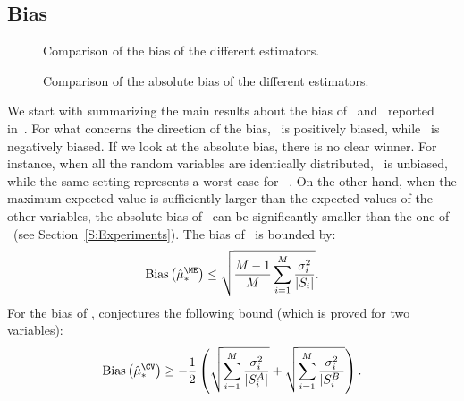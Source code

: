\subsection{Bias}

\begin{figure}[t]
    \begin{minipage}{0.45\textwidth}
    \centering 
    \setlength\figureheight{4cm}
    \setlength\figurewidth{6cm}
     
    \caption{Comparison of the bias of the different estimators.}\label{F:bias}
    \end{minipage}
    \hfill
    \begin{minipage}{0.54\textwidth}    
    \centering 
    \setlength\figureheight{4cm}
    \setlength\figurewidth{6cm}
     
    \caption{Comparison of the absolute bias of the different estimators.}\label{F:absolute_bias}
    \end{minipage}
\end{figure}

We start with summarizing the main results about the bias of \ME~and \CV~reported in~\cite{van2013estimating}.
For what concerns the direction of the bias, \ME~is positively biased, while \CV~is negatively biased.
If we look at the absolute bias, there is no clear winner. 
For instance, when all the random variables are identically distributed, \CV~is unbiased, while the same setting represents a worst case for \ME~.
On the other hand, when the maximum expected value is sufficiently larger than the expected values of the other variables, the absolute bias of \ME~can be significantly smaller than the one of \CV~(see Section~\ref{S:Experiments}).
The bias of \ME~is bounded by:
$$\mathrm{Bias}\left(\est{\ME}\right) \leq \sqrt{\frac{M-1}{M}\sum_{i=1}^M \frac{\sigma_i^2}{|S_i|}}.$$
For the bias of \CV, \citet{van2013estimating} conjectures the following bound (which is proved for two variables):
$$\mathrm{Bias}\left(\est{\CV}\right) \geq -\frac{1}{2}\left(\sqrt{\sum_{i=1}^M \frac{\sigma_i^2}{|S^A_i|}} + \sqrt{\sum_{i=1}^M \frac{\sigma_i^2}{|S^B_i|}}\right). $$

